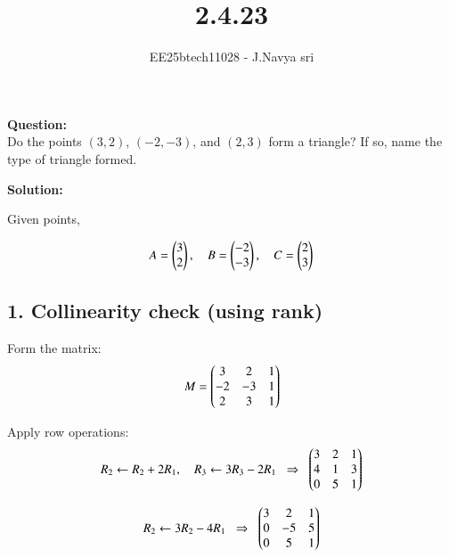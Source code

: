 \documentclass[journal]{IEEEtran}
\begin{document}

\vspace{3cm}

\title{2.4.23}
\author{EE25btech11028 - J.Navya sri}
{\let\newpage\relax\maketitle}




\textbf{Question:}\\
Do the points \( (3, 2) \), \( (-2, -3) \), and \( (2, 3) \) form a triangle? If so, name the type of triangle formed.


\vspace{0.5cm}
\textbf{Solution:}

Given points,

\begin{equation}
A=\begin{pmatrix}3\\2\end{pmatrix}, \quad 
B=\begin{pmatrix}-2\\-3\end{pmatrix}, \quad 
C=\begin{pmatrix}2\\3\end{pmatrix}
\end{equation}

\subsection*{1. Collinearity check (using rank)}

Form the matrix:
\begin{equation}
M=\begin{pmatrix}
3 & 2 & 1\\
-2 & -3 & 1\\
2 & 3 & 1
\end{pmatrix}
\end{equation}

Apply row operations:
\begin{equation}
R_2 \leftarrow R_2+2R_1,\quad R_3 \leftarrow 3R_3-2R_1
\;\;\Rightarrow\;\;
\begin{pmatrix}
3 & 2 & 1\\
4 & 1 & 3\\
0 & 5 & 1
\end{pmatrix}
\end{equation}

\begin{equation}
R_2 \leftarrow 3R_2-4R_1
\;\;\Rightarrow\;\;
\begin{pmatrix}
3 & 2 & 1\\
0 & -5 & 5\\
0 & 5 & 1
\end{pmatrix}
\end{equation}
\end{document}
